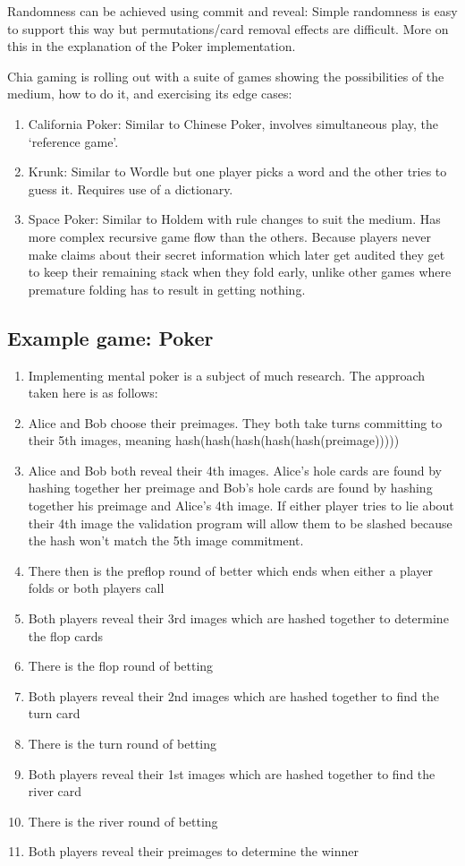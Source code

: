 \documentclass[a4paper]{article}
\begin{document}
\begin{multicols}{2}
Randomness can be achieved using commit and reveal: Simple randomness is easy to support this way but permutations/card removal effects are difficult. More on this in the explanation of the Poker implementation.

Chia gaming is rolling out with a suite of games showing the possibilities of the medium, how to do it, and exercising its edge cases:
\begin{enumerate}
\item California Poker: Similar to Chinese Poker, involves simultaneous play, the ‘reference game’.
\item Krunk: Similar to Wordle but one player picks a word and the other tries to guess it. Requires use of a dictionary.
\item Space Poker: Similar to Holdem with rule changes to suit the medium. Has more complex recursive game flow than the others. Because players never make claims about their secret information which later get audited they get to keep their remaining stack when they fold early, unlike other games where premature folding has to result in getting nothing.
\end{enumerate}

\subsection{Example game: Poker}

\begin{enumerate}
    \item Implementing mental poker is a subject of much research. The approach taken here is as follows:
    \item Alice and Bob choose their preimages. They both take turns committing to their 5th images, meaning hash(hash(hash(hash(hash(preimage)))))
    \item Alice and Bob both reveal their 4th images. Alice’s hole cards are found by hashing together her preimage and Bob’s hole cards are found by hashing together his preimage and Alice’s 4th image. If either player tries to lie about their 4th image the validation program will allow them to be slashed because the hash won’t match the 5th image commitment.
    \item There then is the preflop round of better which ends when either a player folds or both players call
    \item Both players reveal their 3rd images which are hashed together to determine the flop cards
    \item There is the flop round of betting
    \item Both players reveal their 2nd images which are hashed together to find the turn card
    \item There is the turn round of betting
    \item Both players reveal their 1st images which are hashed together to find the river card
    \item There is the river round of betting
    \item Both players reveal their preimages to determine the winner
\end{enumerate}


\end{multicols}
\end{document}
